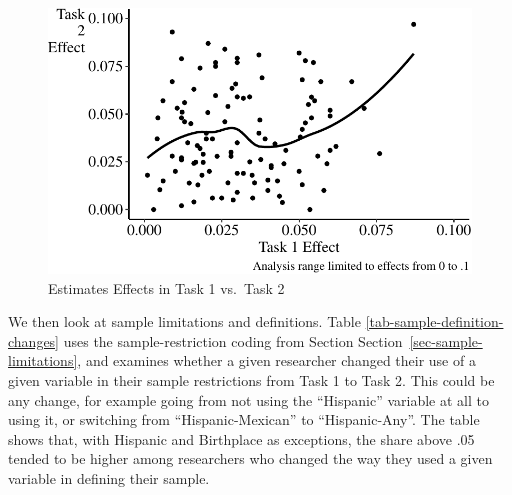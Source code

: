 \documentclass[
  letterpaper,
  DIV=11,
  numbers=noendperiod]{scrartcl}
\begin{document}
\begin{figure}

{\centering \includegraphics{The-Sources-of-Researcher-Variation-in-Economics_files/figure-pdf/fig-task-1-vs-2-1.pdf}

}

\caption{\label{fig-task-1-vs-2}Estimates Effects in Task 1 vs.~Task 2}

\end{figure}

We then look at sample limitations and definitions. Table
\ref{tab-sample-definition-changes} uses the sample-restriction coding
from Section Section~\ref{sec-sample-limitations}, and examines whether
a given researcher changed their use of a given variable in their sample
restrictions from Task 1 to Task 2. This could be any change, for
example going from not using the ``Hispanic'' variable at all to using
it, or switching from ``Hispanic-Mexican'' to ``Hispanic-Any''. The
table shows that, with Hispanic and Birthplace as exceptions, the share
above .05 tended to be higher among researchers who changed the way they
used a given variable in defining their sample.
\end{document}
